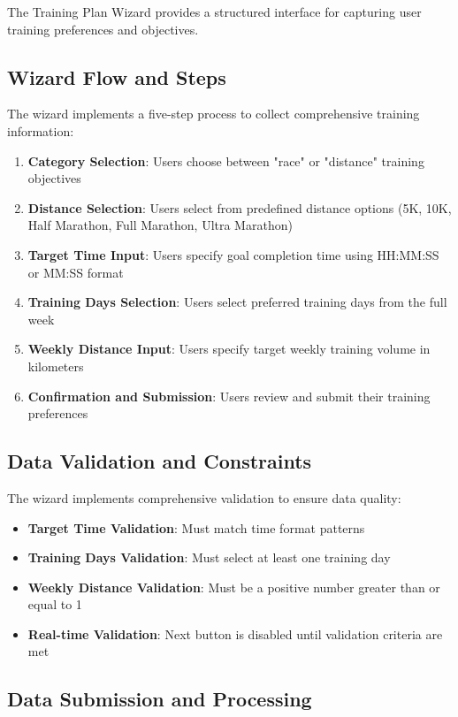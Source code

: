 The Training Plan Wizard provides a structured interface for capturing user training preferences and objectives.

\subsection{Wizard Flow and Steps}

The wizard implements a five-step process to collect comprehensive training information:

\begin{enumerate}
    \item \textbf{Category Selection}: Users choose between "race" or "distance" training objectives
    \item \textbf{Distance Selection}: Users select from predefined distance options (5K, 10K, Half Marathon, Full Marathon, Ultra Marathon)
    \item \textbf{Target Time Input}: Users specify goal completion time using HH:MM:SS or MM:SS format
    \item \textbf{Training Days Selection}: Users select preferred training days from the full week
    \item \textbf{Weekly Distance Input}: Users specify target weekly training volume in kilometers
    \item \textbf{Confirmation and Submission}: Users review and submit their training preferences
\end{enumerate}

\subsection{Data Validation and Constraints}

The wizard implements comprehensive validation to ensure data quality:

\begin{itemize}
    \item \textbf{Target Time Validation}: Must match time format patterns
    \item \textbf{Training Days Validation}: Must select at least one training day
    \item \textbf{Weekly Distance Validation}: Must be a positive number greater than or equal to 1
    \item \textbf{Real-time Validation}: Next button is disabled until validation criteria are met
\end{itemize}

\subsection{Data Submission and Processing}

